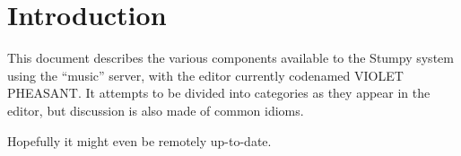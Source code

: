 \section{Introduction}
This document describes the various components available to the
Stumpy system using the ``music'' server, with the editor currently
codenamed VIOLET PHEASANT. It attempts to be divided into categories
as they appear in the editor, but discussion is also made of common
idioms.

Hopefully it might even be remotely up-to-date.




